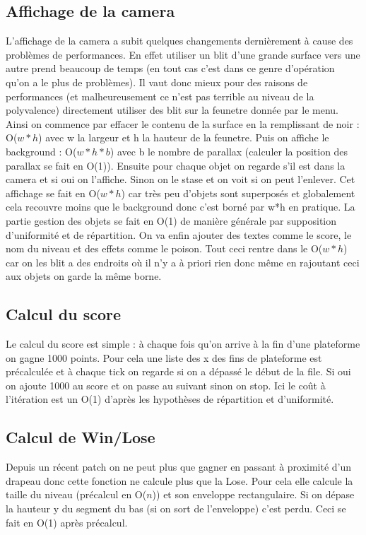 \documentclass[11pt]{article}
\begin{document}
\subsection{Affichage de la camera}
L'affichage de la camera a subit quelques changements dernièrement à cause des problèmes de performances. En effet utiliser un blit d'une grande surface vers une autre prend beaucoup de temps (en tout cas c'est dans ce genre d'opération qu'on a le plus de problèmes). Il vaut donc mieux pour des raisons de performances (et malheureusement ce n'est pas terrible au niveau de la polyvalence) directement utiliser des blit sur la feunetre donnée par le menu. Ainsi on commence par effacer le contenu de la surface en la remplissant de noir : O($w*h$) avec w la largeur et h la hauteur de la feunetre. Puis on affiche le background : O($w*h*b$) avec b le nombre de parallax (calculer la position des parallax se fait en O(1)). Ensuite pour chaque objet on regarde s'il est dans la camera et si oui on l'affiche. Sinon on le stase et on voit si on peut l'enlever. Cet affichage se fait en O($w*h$) car très peu d'objets sont superposés et globalement cela recouvre moins que le background donc c'est borné par w*h en pratique. La partie gestion des objets se fait en O(1) de manière générale par supposition d'uniformité et de répartition. On va enfin ajouter des textes comme le score, le nom du niveau et des effets comme le poison. Tout ceci rentre dans le O($w*h$) car on les blit a des endroits où il n'y a à priori rien donc même en rajoutant ceci aux objets on garde la même borne.
\subsection{Calcul du score}
Le calcul du score est simple : à chaque fois qu'on arrive à la fin d'une plateforme on gagne 1000 points. Pour cela une liste des x des fins de plateforme est précalculée et à chaque tick on regarde si on a dépassé le début de la file. Si oui on ajoute 1000 au score et on passe au suivant sinon on stop. Ici le coût à l'itération est un O(1) d'après les hypothèses de répartition et d'uniformité.
\subsection{Calcul de Win/Lose}
Depuis un récent patch on ne peut plus que gagner en passant à proximité d'un drapeau donc cette fonction ne calcule plus que la Lose. Pour cela elle calcule la taille du niveau (précalcul en O($n$)) et son enveloppe rectangulaire. Si on dépase la hauteur y du segment du bas (si on sort de l'enveloppe) c'est perdu. Ceci se fait en O(1) après précalcul.
\end{document}
